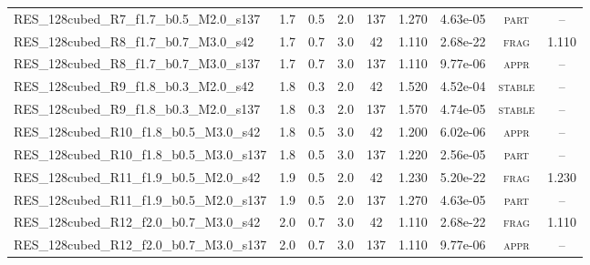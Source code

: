 \begin{table}
\begin{tabular}{lcccccccc}
  RES\_128cubed\_R7\_f1.7\_b0.5\_M2.0\_s137 & 1.7 & 0.5 & 2.0 & 137 & 1.270 & 4.63e-05 & \textsc{part} & -- \\
  RES\_128cubed\_R8\_f1.7\_b0.7\_M3.0\_s42 & 1.7 & 0.7 & 3.0 & 42 & 1.110 & 2.68e-22 & \textsc{frag} & 1.110 \\
  RES\_128cubed\_R8\_f1.7\_b0.7\_M3.0\_s137 & 1.7 & 0.7 & 3.0 & 137 & 1.110 & 9.77e-06 & \textsc{appr} & -- \\
  RES\_128cubed\_R9\_f1.8\_b0.3\_M2.0\_s42 & 1.8 & 0.3 & 2.0 & 42 & 1.520 & 4.52e-04 & \textsc{stable} & -- \\
  RES\_128cubed\_R9\_f1.8\_b0.3\_M2.0\_s137 & 1.8 & 0.3 & 2.0 & 137 & 1.570 & 4.74e-05 & \textsc{stable} & -- \\
  RES\_128cubed\_R10\_f1.8\_b0.5\_M3.0\_s42 & 1.8 & 0.5 & 3.0 & 42 & 1.200 & 6.02e-06 & \textsc{appr} & -- \\
  RES\_128cubed\_R10\_f1.8\_b0.5\_M3.0\_s137 & 1.8 & 0.5 & 3.0 & 137 & 1.220 & 2.56e-05 & \textsc{part} & -- \\
  RES\_128cubed\_R11\_f1.9\_b0.5\_M2.0\_s42 & 1.9 & 0.5 & 2.0 & 42 & 1.230 & 5.20e-22 & \textsc{frag} & 1.230 \\
  RES\_128cubed\_R11\_f1.9\_b0.5\_M2.0\_s137 & 1.9 & 0.5 & 2.0 & 137 & 1.270 & 4.63e-05 & \textsc{part} & -- \\
  RES\_128cubed\_R12\_f2.0\_b0.7\_M3.0\_s42 & 2.0 & 0.7 & 3.0 & 42 & 1.110 & 2.68e-22 & \textsc{frag} & 1.110 \\
  RES\_128cubed\_R12\_f2.0\_b0.7\_M3.0\_s137 & 2.0 & 0.7 & 3.0 & 137 & 1.110 & 9.77e-06 & \textsc{appr} & -- \\
\hline
\end{tabular}
\end{table}
